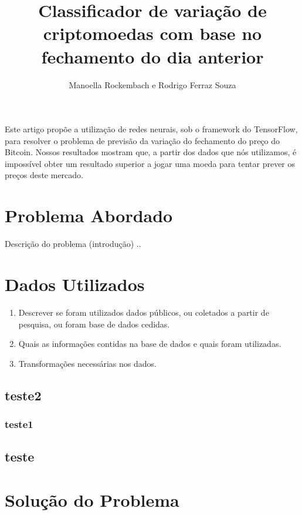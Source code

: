 \documentclass[12pt]{article}
\title{Classificador de variação de criptomoedas com base no fechamento do dia anterior}
\author{Manoella Rockembach\inst{1} e Rodrigo Ferraz Souza\inst{1}}
\begin{document}
 

\maketitle

\begin{resumo} 
  Este artigo propõe a utilização de redes neurais, sob o framework do TensorFlow, para resolver o problema de previsão da variação do fechamento do preço do Bitcoin. Nossos resultados mostram que, a partir dos dados que nós utilizamos, é impossível obter um resultado superior a jogar uma moeda para tentar prever os preços deste mercado.
  
\end{resumo}



\section{Problema Abordado}

Descrição do problema (introdução) ..

\section{Dados Utilizados} 

\begin{enumerate}
    \item Descrever se foram utilizados dados públicos, ou coletados a partir de pesquisa, ou foram base de dados cedidas.
    \item Quais as informações contidas na base de dados e quais foram utilizadas.
    \item Transformações necessárias nos dados.
\end{enumerate}

\subsection{teste2}
\subsubsection{teste1}
\subsection{teste}

\section{Solução do Problema}
\end{document}
